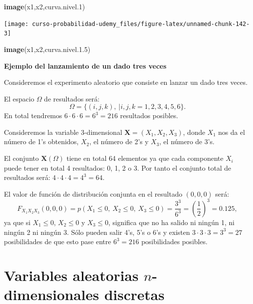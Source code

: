 \documentclass[]{book}
\newenvironment{Shaded}{\begin{snugshade}}{\end{snugshade}}
\newcommand{\FloatTok}[1]{\textcolor[rgb]{0.00,0.00,0.81}{#1}}
\newcommand{\KeywordTok}[1]{\textcolor[rgb]{0.13,0.29,0.53}{\textbf{#1}}}
\newcommand{\NormalTok}[1]{#1}
\begin{document}
\begin{Shaded}
\begin{Highlighting}[]
\KeywordTok{image}\NormalTok{(x1,x2,curva.nivel}\FloatTok{.1}\NormalTok{)}
\end{Highlighting}
\end{Shaded}

\begin{center}\texttt{[image: curso-probabilidad-udemy\_files/figure-latex/unnamed-chunk-142-3]} \end{center}

\begin{Shaded}
\begin{Highlighting}[]
\KeywordTok{image}\NormalTok{(x1,x2,curva.nivel.}\FloatTok{1.5}\NormalTok{)}
\end{Highlighting}
\end{Shaded}

\textbf{Ejemplo del lanzamiento de un dado tres veces}

Consideremos el experimento aleatorio que consiste en lanzar un dado tres veces.

El espacio \(\Omega\) de resultados será:
\[
\Omega =\{(i,j,k),\ | i,j,k=1,2,3,4,5,6\}.
\]
En total tendremos \(6\cdot 6\cdot 6=6^3=216\) resultados posibles.

Consideremos la variable 3-dimensional \(\mathbf{X}=(X_1,X_2,X_3)\), donde \(X_1\) nos da el número de 1's obtenidos, \(X_2\), el número de 2's y \(X_3\), el número de 3's.

El conjunto \(\mathbf{X}(\Omega)\) tiene en total 64 elementos ya que cada componente \(X_i\) puede tener en total 4 resultados: 0, 1, 2 o 3. Por tanto el conjunto total de resultados será: \(4\cdot 4\cdot 4=4^3=64\).

El valor de función de distribución conjunta en el resultado \((0,0,0)\) será:
\[
F_{X_1X_2X_3}(0,0,0)=p(X_1\leq 0,\ X_2\leq 0,\ X_3\leq 0)=\frac{3^3}{6^3}=\left(\frac{1}{2}\right)^3 =0.125,
\]
ya que si \(X_1\leq 0\), \(X_2\leq 0\) y \(X_3\leq 0\), significa que no ha salido ni ningún 1, ni ningún 2 ni ningún 3. Sólo pueden salir 4's, 5's o 6's y existen \(3\cdot 3\cdot 3=3^3=27\) posibilidades de que esto pase entre \(6^3=216\) posibilidades posibles.

\hypertarget{variables-aleatorias-n-dimensionales-discretas}{%
\section{\texorpdfstring{Variables aleatorias \(n\)-dimensionales discretas}{Variables aleatorias n-dimensionales discretas}}\label{variables-aleatorias-n-dimensionales-discretas}}
\end{document}
